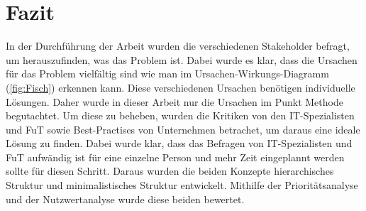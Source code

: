 \chapter{Fazit}
\label{ch:chapter06}
In der Durchführung der Arbeit wurden die verschiedenen Stakeholder befragt, um herauszufinden, was das Problem ist.
Dabei wurde es klar, dass die Ursachen für das Problem vielfältig sind wie man im Ursachen-Wirkungs-Diagramm (\ref{fig:Fisch}) erkennen kann.
Diese verschiedenen Ursachen benötigen individuelle Lösungen.
Daher wurde in dieser Arbeit nur die Ursachen im Punkt Methode begutachtet.
Um diese zu beheben, wurden die Kritiken von den IT-Spezialisten und \ac{FuT} sowie Best-Practises von Unternehmen betrachet, um daraus eine ideale Lösung zu finden.
Dabei wurde klar, dass das Befragen von IT-Spezialisten und \ac{FuT} aufwändig ist für eine einzelne Person und mehr Zeit eingeplannt werden sollte für diesen Schritt.
Daraus wurden die beiden Konzepte hierarchisches Struktur und minimalistisches Struktur entwickelt.
Mithilfe der Prioritätsanalyse und der Nutzwertanalyse wurde diese beiden bewertet.

